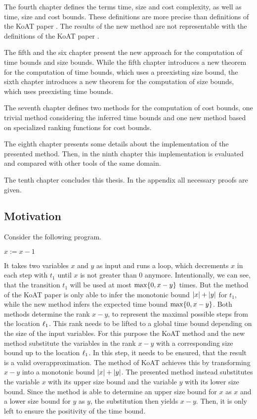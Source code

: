 The fourth chapter defines the terms time, size and cost complexity, as well as time, size and cost bounds.
These definitions are more precise than definitions of the KoAT paper \cite{koat}.
The results of the new method are not representable with the definitions of the KoAT paper \cite{koat}.

The fifth and the six chapter present the new approach for the computation of time bounds and size bounds.
While the fifth chapter introduces a new theorem for the computation of time bounds, which uses a preexisting size bound, the sixth chapter introduces a new theorem for the computation of size bounds, which uses preexisting time bounds.

The seventh chapter defines two methods for the computation of cost bounds, one trivial method considering the inferred time bounds and one new method based on specialized ranking functions for cost bounds.

The eighth chapter presents some details about the implementation of the presented method.
Then, in the ninth chapter this implementation is evaluated and compared with other tools of the same domain.

The tenth chapter concludes this thesis.
In the appendix all necessary proofs are given.

\subsection{Motivation}

Consider the following program.

\begin{algorithmic}
    \State $x := x - 1$
  \EndWhile
\end{algorithmic}

It takes two variables $x$ and $y$ as input and runs a loop, which decrements $x$ in each step with $t_1$ until $x$ is not greater than 0 anymore.
Intentionally, we can see, that the transition $t_1$ will be used at most $\max \lbrace 0, x-y \rbrace$ times.
But the method of the KoAT paper \cite{koat} is only able to infer the monotonic bound $\left|x\right|+\left|y\right|$ for $t_1$, while the new method infers the expected time bound $\max \lbrace 0, x-y \rbrace$.
Both methods determine the rank $x-y$, to represent the maximal possible steps from the location $\ell_1$.
This rank needs to be lifted to a global time bound depending on the size of the input variables.
For this purpose the KoAT method and the new method substitute the variables in the rank $x-y$ with a corresponding size bound up to the location $\ell_1$.
In this step, it needs to be ensured, that the result is a valid overapproximation.
The method of KoAT achieves this by transforming $x-y$ into a monotonic bound $\left|x\right|+\left|y\right|$.
The presented method instead substitutes the variable $x$ with its upper size bound and the variable $y$ with its lower size bound.
Since the method is able to determine an upper size bound for $x$ as $x$ and a lower size bound for $y$ as $y$, the substitution then yields $x-y$.
Then, it is only left to ensure the positivity of the time bound.

